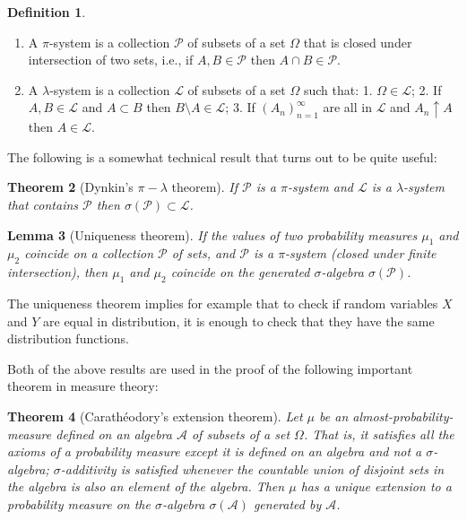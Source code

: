 \documentclass[11pt]{report}
\providecommand{\cal}{\mathcal}
\theoremstyle{plain}
\newtheorem{thm}{Theorem}[chapter]
\newtheorem{lem}[thm]{Lemma}
\theoremstyle{definition}
\newtheorem{defn}[thm]{Definition}
\begin{document}
\begin{defn}

\begin{enumerate}[label=(\roman*)]
\item A $\pi$-system is a collection ${\cal P}$ of subsets
of a set $\Omega$ that is closed under intersection
of two sets, i.e., if $A,B\in {\cal P}$ then
$A\cap B\in {\cal P}$.

\item A $\lambda$-system is a collection ${\cal L}$ of
subsets of a set $\Omega$ such that: 1.
$\Omega \in {\cal L}$; 2. If $A,B\in {\cal L}$ and
$A\subset B$ then $B\setminus A\in {\cal L}$; 3. If
$(A_n)_{n=1}^\infty$ are all in ${\cal L}$ and
$A_n \uparrow A$ then $A\in {\cal L}$.
\end{enumerate}

\end{defn}

The following is a somewhat technical result that
turns out to be quite useful:

\begin{thm}[Dynkin's $\pi-\lambda$ theorem]
If ${\cal P}$ is a $\pi$-system and ${\cal L}$ is a
$\lambda$-system that contains ${\cal P}$ then
$\sigma({\cal P}) \subset {\cal L}$.
\end{thm}

\begin{lem}[Uniqueness theorem]
If the values of two probability measures $\mu_1$ and
$\mu_2$ coincide on a collection ${\cal P}$ of sets,
and ${\cal P}$ is a $\pi$-system (closed under finite
intersection), then $\mu_1$ and $\mu_2$ coincide on
the generated $\sigma$-algebra $\sigma({\cal P})$.
\end{lem}

The uniqueness theorem implies for example that to
check if random variables $X$ and $Y$ are equal in
distribution, it is enough to check that they have the
same distribution functions.

Both of the above results are used in the proof of
the following important theorem in measure theory:

\begin{thm}[Carathéodory's extension theorem]
Let $\mu$ be an almost-probability-measure defined on
an algebra ${\cal A}$ of subsets of a set $\Omega$.
That is, it satisfies all the axioms of a probability
measure except it is defined on an algebra and not a
$\sigma$-algebra; $\sigma$-additivity is satisfied
whenever the countable union of disjoint sets in the
algebra is also an element of the algebra. Then $\mu$
has a unique extension to a probability measure on the
$\sigma$-algebra $\sigma({\cal A})$ generated by
${\cal A}$.
\end{thm}
\end{document}
